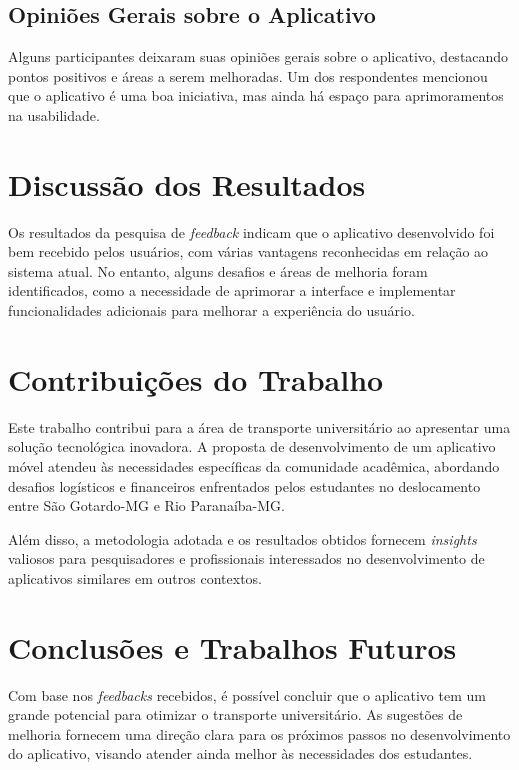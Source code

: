 \documentclass[
    12pt,                   %
    openright,              %
    oneside,                %
    a4paper,                %
    sumario=tradicional,    %
    english,                %
    brazil,                 %
    ]{abntex2}
\begin{document}
\subsection{Opiniões Gerais sobre o Aplicativo}

Alguns participantes deixaram suas opiniões gerais sobre o aplicativo, destacando pontos positivos e áreas a serem melhoradas. Um dos respondentes mencionou que o aplicativo é uma boa iniciativa, mas ainda há espaço para aprimoramentos na usabilidade.


\section{Discussão dos Resultados}
\label{sec:discussao-resultados}

Os resultados da pesquisa de \textit{feedback} indicam que o aplicativo desenvolvido foi bem recebido pelos usuários, com várias vantagens reconhecidas em relação ao sistema atual. No entanto, alguns desafios e áreas de melhoria foram identificados, como a necessidade de aprimorar a interface e implementar funcionalidades adicionais para melhorar a experiência do usuário.


\section{Contribuições do Trabalho}

Este trabalho contribui para a área de transporte universitário ao apresentar uma solução tecnológica inovadora. A proposta de desenvolvimento de um aplicativo móvel atendeu às necessidades específicas da comunidade acadêmica, abordando desafios logísticos e financeiros enfrentados pelos estudantes no deslocamento entre São Gotardo-MG e Rio Paranaíba-MG.

Além disso, a metodologia adotada e os resultados obtidos fornecem \textit{insights} valiosos para pesquisadores e profissionais interessados no desenvolvimento de aplicativos similares em outros contextos.

\section{Conclusões e Trabalhos Futuros}
\label{sec:conclusoes-trabalhos-futuros}

Com base nos \textit{feedbacks} recebidos, é possível concluir que o aplicativo tem um grande potencial para otimizar o transporte universitário. As sugestões de melhoria fornecem uma direção clara para os próximos passos no desenvolvimento do aplicativo, visando atender ainda melhor às necessidades dos estudantes.
\end{document}
